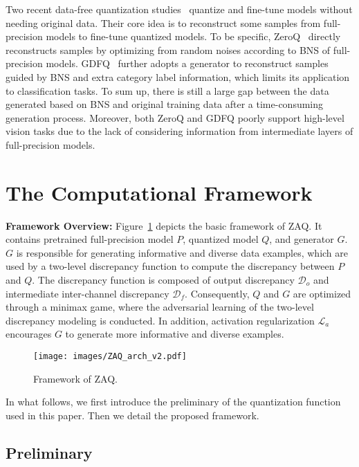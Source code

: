 \documentclass[final]{cvpr}
\begin{document}
Two recent data-free quantization studies~\cite{cai2020zeroq,xu2020generative} quantize and fine-tune models without needing original data. 
Their core idea is to reconstruct some samples from full-precision models to fine-tune quantized models. 
To be specific, ZeroQ~\cite{cai2020zeroq} directly reconstructs samples by optimizing from random noises according to BNS of full-precision models.
GDFQ~\cite{xu2020generative} further adopts a generator to reconstruct samples guided by BNS and extra category label information, which limits its application to classification tasks. 
To sum up, there is still a large gap between the data generated based on BNS and original training data after a time-consuming generation process.
Moreover, both ZeroQ and GDFQ poorly support high-level vision tasks due to the lack of considering information from intermediate layers of full-precision models.




\section{The Computational Framework}

\textbf{Framework Overview:} Figure~\ref{fig:ZAQ} depicts the basic framework of ZAQ. 
It contains pretrained full-precision model $P$, quantized model $Q$, and generator $G$.
$G$ is responsible for generating informative and diverse data examples, which are used by a two-level discrepancy function to compute the discrepancy between $P$ and $Q$.
The discrepancy function is composed of output discrepancy $\mathcal{D}_{o}$ and intermediate inter-channel discrepancy $\mathcal{D}_{f}$.
Consequently, $Q$ and $G$ are optimized through a minimax game, where the adversarial learning of the two-level discrepancy modeling is conducted.
In addition, activation regularization $\mathcal{L}_{a}$ encourages $G$ to generate more informative and diverse examples.

\begin{figure}[!t]
  \centering
  \texttt{[image: images/ZAQ\_arch\_v2.pdf]}
  \caption{Framework of ZAQ.}
  \label{fig:ZAQ}
\end{figure}

In what follows, we first introduce the preliminary of the quantization function used in this paper.
Then we detail the proposed framework.

\subsection{Preliminary}
\end{document}
